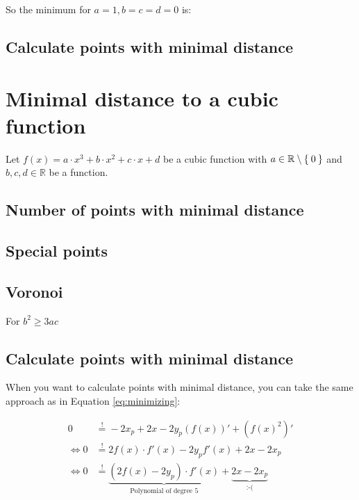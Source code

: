 \documentclass[a4paper]{scrartcl}
\def\mdr{\ensuremath{\mathbb{R}}}
\begin{document}
So the minimum for $a=1, b=c=d=0$ is:


\subsection{Calculate points with minimal distance}
\section{Minimal distance to a cubic function}
Let $f(x) = a \cdot x^3 + b \cdot x^2 + c \cdot x + d$ be a cubic function
with $a \in \mdr \setminus \Set{0}$ and 
$b, c, d \in \mdr$ be a function.

\subsection{Number of points with minimal distance}


\subsection{Special points}

\subsection{Voronoi}

For $b^2 \geq 3ac$

\subsection{Calculate points with minimal distance}
When you want to calculate points with minimal distance, you can 
take the same approach as in Equation \ref{eq:minimizing}:

\begin{align}
    0  &\stackrel{!}{=} -2 x_p + 2x -2y_p(f(x))' + (f(x)^2)'\\
    \Leftrightarrow 0 &\stackrel{!}{=} 2 f(x) \cdot f'(x) - 2 y_p f'(x) + 2x - 2 x_p\\
    \Leftrightarrow 0 &\stackrel{!}{=} \underbrace{\left (2 f(x) - 2 y_p \right ) \cdot f'(x)}_{\text{Polynomial of degree 5}} + \underbrace{2x - 2 x_p}_{\text{:-(}}
\end{align}



\end{document}
